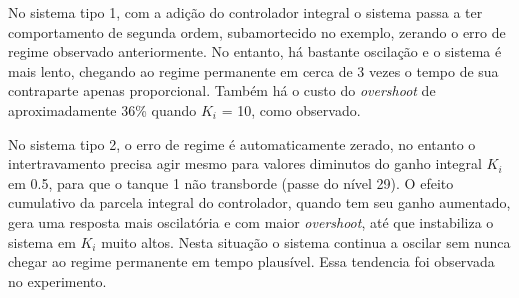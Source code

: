 

No sistema tipo 1, com a adição do controlador integral o sistema passa a ter comportamento de segunda ordem, subamortecido no exemplo, zerando o erro de regime observado anteriormente. No entanto, há bastante oscilação e o sistema é mais lento, chegando ao regime permanente em cerca de 3 vezes o tempo de sua contraparte apenas proporcional. Também há o custo do \emph{overshoot} de aproximadamente 36\% quando $K_i$ = 10, como observado.

No sistema tipo 2, o erro de regime é automaticamente zerado, no entanto o intertravamento precisa agir mesmo para valores diminutos do ganho integral $K_i$ em 0.5, para que o tanque 1 não transborde (passe do nível 29). O efeito cumulativo da parcela integral do controlador, quando tem seu ganho aumentado, gera uma resposta mais oscilatória e com maior \emph{overshoot}, até que instabiliza o sistema em $K_i$ muito altos. Nesta situação o sistema continua a oscilar sem nunca chegar ao regime permanente em tempo plausível. Essa tendencia foi observada no experimento.
